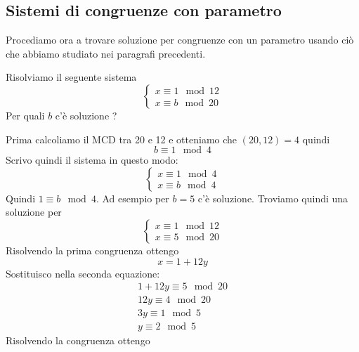 \subsection{Sistemi di congruenze con parametro}
Procediamo ora a trovare soluzione per congruenze con un parametro usando ci\`o che abbiamo studiato
nei paragrafi precedenti.

\begin{example}
	Risolviamo il seguente sistema
	\begin{equation*}
		\begin{cases}
			x \equiv 1 \mod{12} \\
			x \equiv b \mod{20}
		\end{cases}
	\end{equation*}
	Per quali $b$ c'\`e soluzione ?

	Prima calcoliamo il MCD tra 20 e 12 e otteniamo che $(20, 12) = 4$ quindi
	\begin{equation*}
		b \equiv 1 \mod{4}
	\end{equation*}
	Scrivo quindi il sistema in questo modo:
	\begin{equation*}
		\begin{cases}
			x \equiv 1 \mod{4} \\
			x \equiv b \mod{4}
		\end{cases}
	\end{equation*}
	Quindi $1 \equiv b \mod{4}$. Ad esempio per $b = 5$ c'\`e soluzione. Troviamo quindi una
	soluzione per
	\begin{equation*}
		\begin{cases}
			x \equiv 1 \mod{12} \\
			x \equiv 5 \mod{20}
		\end{cases}
	\end{equation*}
	Risolvendo la prima congruenza ottengo
	\begin{equation*}
		x = 1 + 12y
	\end{equation*}
	Sostituisco nella seconda equazione:
	\begin{equation*}
		\begin{array}{l}
			1 + 12y \equiv 5 \mod{20} \\
			12y \equiv 4 \mod{20}     \\
			3y \equiv 1 \mod{5}       \\
			y \equiv 2 \mod{5}
		\end{array}
	\end{equation*}
	Risolvendo la congruenza ottengo
	\begin{equation*}

\end{equation*}
\end{example}
